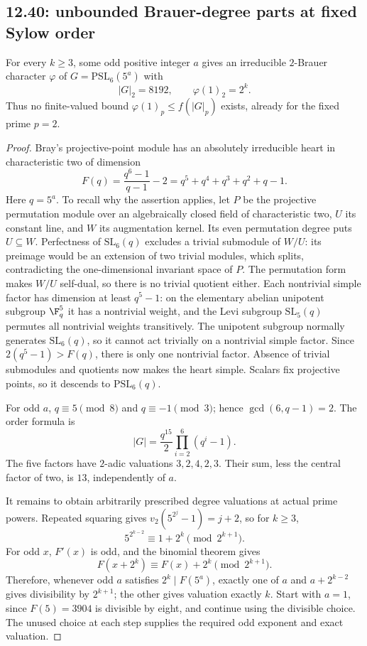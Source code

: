 \subsection{12.40: unbounded Brauer-degree parts at fixed Sylow order}
\label{cand:12.40}
\begin{proposition}
For every \(k\ge3\), some odd positive integer \(a\) gives an
irreducible \(2\)-Brauer character \(\varphi\) of
\(G=\mathrm{PSL}_6(5^a)\) with
\[
 |G|_2=8192,\qquad \varphi(1)_2=2^k.
\]
Thus no finite-valued bound \(\varphi(1)_p\le f(|G|_p)\) exists,
already for the fixed prime \(p=2\).
\end{proposition}
\begin{proof}
Bray's projective-point module \cite[Main Theorem]{bray-cohomology}
has an absolutely irreducible heart in characteristic two of dimension
\[
 F(q)=\frac{q^6-1}{q-1}-2=q^5+q^4+q^3+q^2+q-1.
\]
Here \(q=5^a\). To recall why the assertion applies, let \(P\) be the
projective permutation module over an algebraically closed field of
characteristic two, \(U\) its constant line, and \(W\) its augmentation
kernel. Its even permutation degree puts \(U\subseteq W\).
Perfectness of \(\mathrm{SL}_6(q)\) excludes a trivial submodule of
\(W/U\): its preimage would be an extension of two trivial modules,
which splits, contradicting the one-dimensional invariant space of \(P\).
The permutation form makes \(W/U\) self-dual, so there is no trivial
quotient either. Each nontrivial simple factor has dimension at least
\(q^5-1\): on the elementary abelian unipotent subgroup \(\F_q^5\)
it has a nontrivial weight, and the Levi subgroup
\(\mathrm{SL}_5(q)\) permutes all nontrivial weights transitively.
The unipotent subgroup normally generates \(\mathrm{SL}_6(q)\), so
it cannot act trivially on a nontrivial simple factor.
Since \(2(q^5-1)>F(q)\), there is only one nontrivial factor.
Absence of trivial submodules and quotients now makes the heart simple.
Scalars fix projective points, so it descends to \(\mathrm{PSL}_6(q)\).

For odd \(a\), \(q\equiv5\pmod8\) and \(q\equiv-1\pmod3\);
hence \(\gcd(6,q-1)=2\). The order formula is
\[
 |G|=\frac{q^{15}}2\prod_{i=2}^{6}(q^i-1).
\]
The five factors have \(2\)-adic valuations \(3,2,4,2,3\).
Their sum, less the central factor of two, is \(13\), independently
of \(a\).

It remains to obtain arbitrarily prescribed degree valuations at
actual prime powers. Repeated squaring gives
\(v_2(5^{2^j}-1)=j+2\), so for \(k\ge3\),
\[
 5^{2^{k-2}}\equiv1+2^k\pmod{2^{k+1}}.
\]
For odd \(x\), \(F'(x)\) is odd, and the binomial theorem gives
\[
 F(x+2^k)\equiv F(x)+2^k\pmod{2^{k+1}}.
\]
Therefore, whenever odd \(a\) satisfies \(2^k\mid F(5^a)\),
exactly one of \(a\) and \(a+2^{k-2}\) gives divisibility by
\(2^{k+1}\); the other gives valuation exactly \(k\).
Start with \(a=1\), since \(F(5)=3904\) is divisible by eight,
and continue using the divisible choice. The unused choice at each
step supplies the required odd exponent and exact valuation.
\end{proof}

